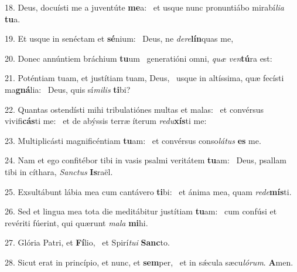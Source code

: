 18. Deus, docuísti me a juventúte \textbf{me}a: \ast\  et usque nunc pronuntiábo mirabí\textit{li}\textit{a} \textbf{tu}a.\

19. Et usque in senéctam et \textbf{sé}nium: \ast\  Deus, ne \textit{de}\textit{re}\textbf{lín}quas me,\

20. Donec annúntiem bráchium \textbf{tu}um \ast\  generatióni omni, \textit{quæ} \textit{ven}\textbf{tú}ra est:\

21. Poténtiam tuam, et justítiam tuam, Deus, \dag\  usque in altíssima, quæ fecísti ma\textbf{gná}lia: \ast\  Deus, quis sí\textit{mi}\textit{lis} \textbf{ti}bi?\

22. Quantas ostendísti mihi tribulatiónes multas et malas: \dag\  et convérsus vivifi\textbf{cás}ti me: \ast\  et de abýssis terræ íterum \textit{re}\textit{du}\textbf{xís}ti me:\

23. Multiplicásti magnificéntiam \textbf{tu}am: \ast\  et convérsus conso\textit{lá}\textit{tus} \textbf{es} me.\

24. Nam et ego confitébor tibi in vasis psalmi veritátem \textbf{tu}am: \ast\  Deus, psallam tibi in cíthara, \textit{Sanc}\textit{tus} \textbf{Is}raël.\

25. Exsultábunt lábia mea cum cantávero \textbf{ti}bi: \ast\  et ánima mea, quam \textit{red}\textit{e}\textbf{mís}ti.\

26. Sed et lingua mea tota die meditábitur justítiam \textbf{tu}am: \ast\  cum confúsi et revériti fúerint, qui quærunt \textit{ma}\textit{la} \textbf{mi}hi.\

27. Glória Patri, et \textbf{Fí}lio, \ast\  et Spirí\textit{tu}\textit{i} \textbf{Sanc}to.\

28. Sicut erat in princípio, et nunc, et \textbf{sem}per, \ast\  et in sǽcula sæcu\textit{ló}\textit{rum}. \textbf{A}men.\

